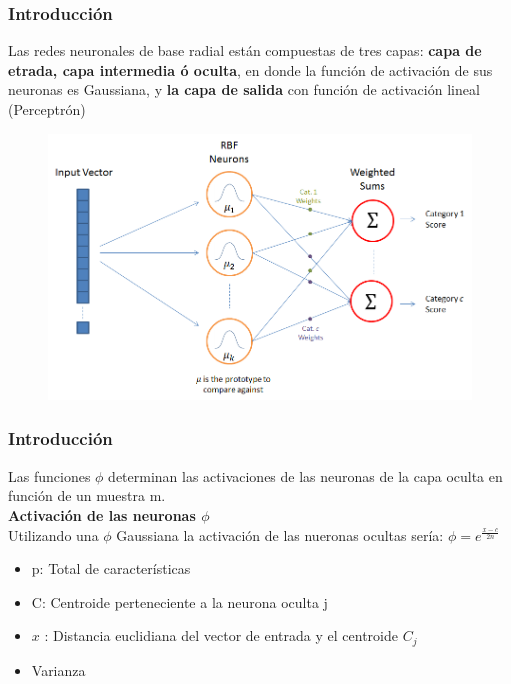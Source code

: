 \documentclass[
	11pt, %
]{beamer}
\begin{document}

\begin{frame}
  \frametitle{Introducción}

  Las redes neuronales de base radial están compuestas de tres capas: \textbf{capa de etrada, capa intermedia ó oculta}, en donde la función de activación de sus neuronas es Gaussiana, y \textbf{la capa de salida} con función de activación lineal (Perceptrón)

  \bigskip %
  
  \begin{figure}
    \includegraphics[width=0.8\linewidth]{architecture_simple2.png}
  \end{figure}
  
\end{frame}

\begin{frame}
  \frametitle{Introducción}

  Las funciones $\phi$ determinan las activaciones de las neuronas de la capa oculta en función de un muestra m.\\

  \textbf{Activación de las neuronas $\phi$}\\

  Utilizando una $\phi$ Gaussiana la activación de las nueronas ocultas sería: $\phi = e^{\frac{x-c}{2n}}$

  \begin{itemize}
  \item p: Total de características
  \item C: Centroide perteneciente a la neurona oculta j
  \item $x$ : Distancia euclidiana del vector de entrada y el centroide $C_{j}$
  \item Varianza
  \end{itemize}
\end{frame}
\end{document}
